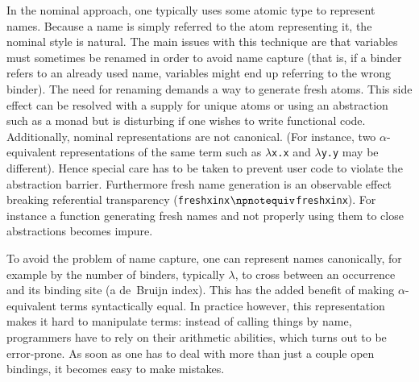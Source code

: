 \documentclass[9pt,authoryear]{sigplanconf}
\begin{document}
%
In the nominal approach, one typically uses some atomic type to
    represent names. Because a name is simply referred to the atom
    representing it, the nominal style is natural. The main issues
    with this technique are that variables must sometimes be renamed
    in order to avoid name capture (that is, if a binder refers to an
    already used name, variables might end up referring to the wrong
    binder). The need for renaming demands a way to generate fresh
    atoms. This side effect can be resolved with a supply for unique
    atoms or using an abstraction such as a monad but is disturbing
    if one wishes to write functional code. Additionally, nominal
    representations are not canonical. (For instance, two $ \alpha $-equivalent
    representations of the same term such as \texttt{$ \lambda $}\texttt{x}\texttt{.}\texttt{x} and \texttt{$ \lambda $}\texttt{y}\texttt{.}\texttt{y}    may be different). Hence special care has to be taken to prevent
    user code to violate the abstraction barrier. Furthermore fresh
    name generation is an observable effect breaking referential
    transparency (\texttt{fresh}\texttt{\mbox{\hspace{0.50em}}}\texttt{x}\texttt{\mbox{\hspace{0.50em}}}\texttt{in}\texttt{\mbox{\hspace{0.50em}}}\texttt{x}\texttt{\mbox{\hspace{0.50em}}}\texttt{\ensuremath{\npnotequiv}}\texttt{\mbox{\hspace{0.50em}}}\texttt{fresh}\texttt{\mbox{\hspace{0.50em}}}\texttt{x}\texttt{\mbox{\hspace{0.50em}}}\texttt{in}\texttt{\mbox{\hspace{0.50em}}}\texttt{x}). For instance a
    function generating fresh names and not properly using them to close
    abstractions becomes impure.%


%
To avoid the problem of name capture, one can represent names
    canonically, for example by the number of binders, typically $ \lambda $,
    to cross between an occurrence and its binding site (a de{~}Bruijn
    index). This has the added benefit of making $ \alpha $-equivalent terms
    syntactically equal. In practice however, this representation makes
    it hard to manipulate terms{:} instead of calling things by name,
    programmers have to rely on their arithmetic abilities, which turns
    out to be error-prone. As soon as one has to deal with more than
    just a couple open bindings, it becomes easy to make mistakes.%
\end{document}
